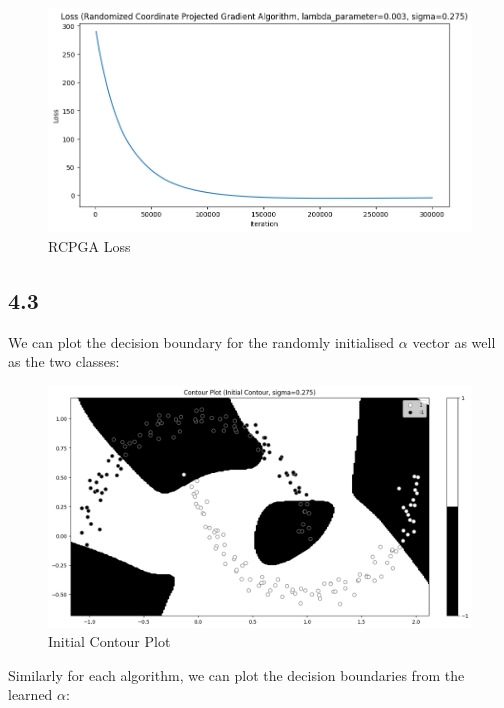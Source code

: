 \documentclass[12pt]{article}
\begin{document}
\begin{figure}[h]
\centering
\includegraphics[scale=0.3]{outputs/part_4/rcpga-loss}
\caption{RCPGA Loss}
\label{fig:}
\end{figure}
\newpage

\subsection*{4.3}

We can plot the decision boundary for the randomly initialised $\alpha$ vector as well as the two classes:

\begin{figure}[h]
\centering
\includegraphics[scale=0.3]{outputs/part_4/initial-contour}
\caption{Initial Contour Plot}
\label{fig:}
\end{figure}

Similarly for each algorithm, we can plot the decision boundaries from the learned $\alpha$:
\end{document}
